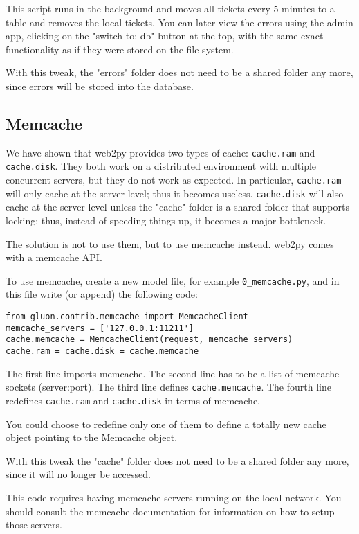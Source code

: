 \documentclass[justified,sixbynine,notoc]{tufte-book}
\def\ft{\small\tt}
\def\inxx#1{\index{#1}}
\begin{document}
\begin{fullwidth}
This script runs in the background and moves all tickets every 5 minutes to a table and removes the local tickets.
You can later view the errors using the admin app, clicking on the "switch to: db" button at the top, with the same exact functionality as if they were stored on the file system.

With this tweak, the "errors" folder does not need to be a shared folder any more, since errors will be stored into the database.

\goodbreak\subsection{Memcache}

\inxx{memcache}

We have shown that web2py provides two types of cache: {\ft cache.ram} and {\ft cache.disk}.
They both work on a distributed environment with multiple concurrent servers, but they do not work as expected. In particular, {\ft cache.ram} will only cache at the server level; thus it becomes useless. {\ft cache.disk} will also cache at the server level unless the "cache" folder is a shared folder that supports locking; thus, instead of speeding things up, it becomes a major bottleneck.

The solution is not to use them, but to use memcache instead. web2py comes with a memcache API.

To use memcache, create a new model file, for example {\ft 0\_memcache.py}, and in this file write (or append) the following code:
\begin{lstlisting}
from gluon.contrib.memcache import MemcacheClient
memcache_servers = ['127.0.0.1:11211']
cache.memcache = MemcacheClient(request, memcache_servers)
cache.ram = cache.disk = cache.memcache
\end{lstlisting}

The first line imports memcache. The second line has to be a list of memcache sockets (server:port).  The third line defines {\ft cache.memcache}.  The fourth line redefines {\ft cache.ram} and {\ft cache.disk} in terms of memcache.

You could choose to redefine only one of them to define a totally new cache object pointing to the Memcache object.

With this tweak the "cache" folder does not need to be a shared folder any more, since it will no longer be accessed.

This code requires having memcache servers running on the local network. You should consult the memcache documentation for information on how to setup those servers.


\end{fullwidth}
\end{document}
